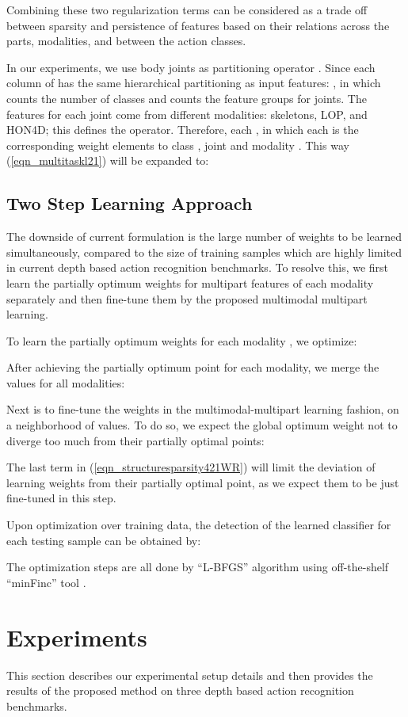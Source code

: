 \documentclass[9pt,technote,compsoc]{IEEEtran}
\begin{document}
Combining these two regularization terms can be considered as a trade off between sparsity and persistence of features \cite{kowalski09sparsity} based on their relations across the parts, modalities, and between the action classes.

In our experiments, we use  body joints as partitioning operator . Since each column of  has the same hierarchical partitioning as input features: , in which  counts the number of classes and  counts the feature groups for  joints. The features for each joint come from  different modalities: skeletons, LOP, and HON4D; this defines the  operator. Therefore, each , in which each  is the corresponding weight elements to class , joint  and modality . This way (\ref{eqn_multitaskl21}) will be expanded to:



\subsection{Two Step Learning Approach}
The downside of current formulation is the large number of weights to be learned simultaneously, compared to the size of training samples which are highly limited in current depth based action recognition benchmarks. To resolve this, we first learn the partially optimum weights for multipart features of each modality separately and then fine-tune them by the proposed multimodal multipart learning. 

To learn the partially optimum weights for each modality , we optimize:


After achieving the partially optimum point for each modality, we merge the  values for all  modalities:


Next is to fine-tune the weights in the multimodal-multipart learning fashion, on a neighborhood of  values. To do so, we expect the global optimum weight not to diverge too much from their partially optimal points:


The last term in (\ref{eqn_structuresparsity421WR}) will limit the deviation of learning weights from their partially optimal point, as we expect them to be just fine-tuned in this step.

Upon optimization over training data, the detection of the learned classifier for each testing sample  can be obtained by:

The optimization steps are all done by ``L-BFGS'' algorithm using off-the-shelf ``minFinc'' tool \cite{schmidt2005minfunc}.

\section{Experiments}
This section describes our experimental setup details and then provides the results of the proposed method on three depth based action recognition benchmarks.
\end{document}
